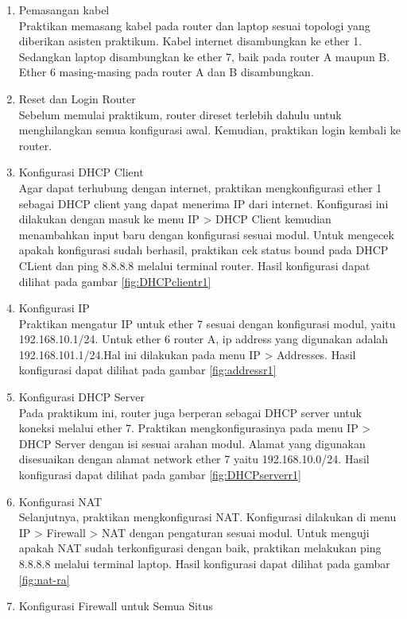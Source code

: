 \begin{enumerate}
  \item Pemasangan kabel \\
  Praktikan memasang kabel pada router dan laptop sesuai topologi yang diberikan asisten praktikum. Kabel internet disambungkan ke ether 1. Sedangkan laptop disambungkan ke ether 7, baik pada router A maupun B. Ether 6 masing-masing pada router A dan B disambungkan.
  \item Reset dan Login Router \\
  Sebelum memulai praktikum, router direset terlebih dahulu untuk menghilangkan semua konfigurasi awal. Kemudian, praktikan login kembali ke router.
  \item Konfigurasi DHCP Client \\
  Agar dapat terhubung dengan internet, praktikan mengkonfigurasi ether 1 sebagai DHCP client yang dapat menerima IP dari internet. Konfigurasi ini dilakukan dengan masuk ke menu IP > DHCP Client kemudian menambahkan input baru dengan konfigurasi sesuai modul. Untuk mengecek apakah konfigurasi sudah berhasil, praktikan cek status bound pada DHCP CLient dan ping 8.8.8.8 melalui terminal router. Hasil konfigurasi dapat dilihat pada gambar \ref{fig:DHCPclientr1}
  \item Konfigurasi IP \\
  Praktikan mengatur IP untuk ether 7 sesuai dengan konfigurasi modul, yaitu 192.168.10.1/24. Untuk ether 6 router A, ip address yang digunakan adalah 192.168.101.1/24.Hal ini dilakukan pada menu IP > Addresses. Hasil konfigurasi dapat dilihat pada gambar \ref{fig:addressr1}
  \item Konfigurasi DHCP Server \\
  Pada praktikum ini, router juga berperan sebagai DHCP server untuk koneksi melalui ether 7. Praktikan mengkonfigurasinya pada menu IP > DHCP Server dengan isi sesuai arahan modul. Alamat yang digunakan disesuaikan dengan alamat network ether 7 yaitu 192.168.10.0/24. Hasil konfigurasi dapat dilihat pada gambar \ref{fig:DHCPserverr1}
  \item Konfigurasi NAT \\
  Selanjutnya, praktikan mengkonfigurasi NAT. Konfigurasi dilakukan di menu IP > Firewall > NAT dengan pengaturan sesuai modul. Untuk menguji apakah NAT sudah terkonfigurasi dengan baik, praktikan melakukan ping 8.8.8.8 melalui terminal laptop. Hasil konfigurasi dapat dilihat pada gambar \ref{fig:nat-ra}
  \item Konfigurasi Firewall untuk Semua Situs\\

\end{enumerate}
